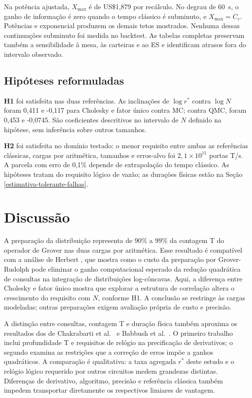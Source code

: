 \documentclass[conference,a4paper]{IEEEtran}
\begin{document}
Na potência ajustada, \(X_{\max}\) é de US\$1,879 por recálculo. No degrau de 60~s, o ganho de informação é zero quando o tempo clássico é subminuto, e \(X_{\max}=C_c\). Potências e exponencial produzem os demais tetos mostrados. Nenhuma dessas continuações subminuto foi medida no backtest. As tabelas completas preservam também a sensibilidade à mesa, às carteiras e ao ES e identificam atrasos fora do intervalo observado.

\subsection{Hipóteses reformuladas}\label{hipuxf3teses-reformuladas}

\textbf{H1} foi satisfeita nas duas referências. As inclinações de \(\log r^*\) contra \(\log N\) foram 0,411 e -0,117 para Cholesky e fator único contra MC; contra QMC, foram 0,453 e -0,0745. São coeficientes descritivos no intervalo de \(N\) definido na hipótese, sem inferência sobre outros tamanhos.

\textbf{H2} foi satisfeita no domínio testado: o menor requisito entre ambas as referências clássicas, cargas por aritmética, tamanhos e erros-alvo foi \(2{,}1\times10^{11}\) portas T/s. A parcela com erro de 0,1\% depende de extrapolação do tempo clássico. As hipóteses tratam do requisito lógico de vazão; as durações físicas estão na Seção \ref{estimativa-tolerante-falhas}.

\section{Discussão}\label{discussuxe3o}

A preparação da distribuição representa de 90\% a 99\% da contagem T do operador de Grover nas duas cargas por aritmética. Esse resultado é compatível com a análise de Herbert \cite{herbert2021groverrudolph}, que mostra como o custo da preparação por Grover-Rudolph pode eliminar o ganho computacional esperado da redução quadrática de consultas na integração de distribuições log-côncavas. Aqui, a diferença entre Cholesky e fator único mostra que explorar a estrutura de correlação altera o crescimento do requisito com \(N\), conforme H1. A conclusão se restringe às cargas modeladas; outras preparações exigem avaliação própria de custo e precisão.

A distinção entre consultas, contagem T e duração física também aproxima os resultados dos de Chakrabarti et al.~\cite{chakrabarti2021threshold} e Babbush et al.~\cite{babbush2021quadratic}. O primeiro trabalho inclui profundidade T e requisitos de relógio na precificação de derivativos; o segundo examina as restrições que a correção de erros impõe a ganhos quadráticos. A comparação é qualitativa: a taxa agregada \(r^*\) deste estudo e o relógio lógico requerido por outros circuitos medem grandezas distintas. Diferenças de derivativo, algoritmo, precisão e referência clássica também impedem transportar diretamente os respectivos limiares de vantagem.
\end{document}
